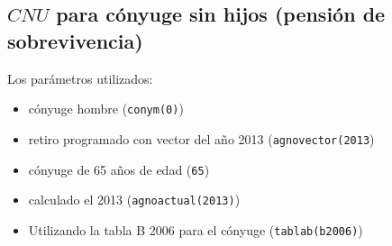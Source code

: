 \documentclass[letterpaper, 11pt]{article}
\begin{document}
\begin{stlog}

\end{stlog}

\subsection{$CNU$ para c\'onyuge sin hijos (pensi\'on de sobrevivencia)\label{sec:ej:cnu_sobr_cnyg_s_hi}}

Los par\'ametros utilizados:
\begin{itemize}
\item c\'onyuge hombre ({\tt conym(0)})
\item retiro programado con vector del a\~no 2013 ({\tt agnovector(2013})
\item c\'onyuge de 65 a\~nos de edad ({\tt 65})
\item calculado el 2013 ({\tt agnoactual(2013)})
\item Utilizando la tabla B 2006 para el c\'onyuge ({\tt tablab(b2006)})
\end{itemize}

\begin{stlog}

\end{stlog}

\clearpage

\nocite{compIIIcapI, compIIIcapX, pino2005}


\end{document}
